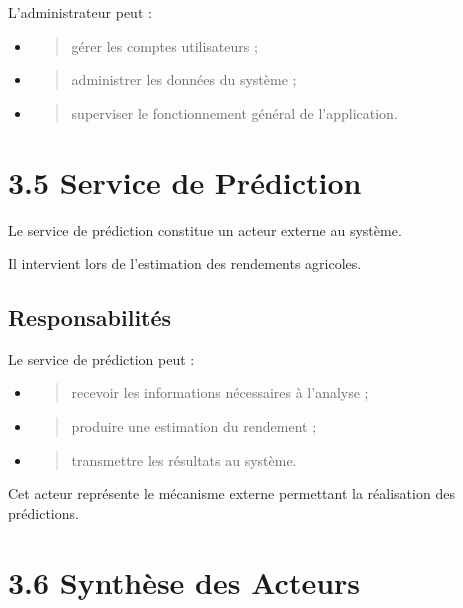 \documentclass[
]{book}
\begin{document}
L'administrateur peut :

\begin{itemize}
\item
  \begin{quote}
  gérer les comptes utilisateurs ;
  \end{quote}
\item
  \begin{quote}
  administrer les données du système ;
  \end{quote}
\item
  \begin{quote}
  superviser le fonctionnement général de l'application.
  \end{quote}
\end{itemize}

\hypertarget{service-de-pruxe9diction}{%
\section{3.5 Service de Prédiction}\label{service-de-pruxe9diction}}

Le service de prédiction constitue un acteur externe au système.

Il intervient lors de l'estimation des rendements agricoles.

\hypertarget{responsabilituxe9s-3}{%
\subsection{Responsabilités}\label{responsabilituxe9s-3}}

Le service de prédiction peut :

\begin{itemize}
\item
  \begin{quote}
  recevoir les informations nécessaires à l'analyse ;
  \end{quote}
\item
  \begin{quote}
  produire une estimation du rendement ;
  \end{quote}
\item
  \begin{quote}
  transmettre les résultats au système.
  \end{quote}
\end{itemize}

Cet acteur représente le mécanisme externe permettant la réalisation des
prédictions.

\hypertarget{synthuxe8se-des-acteurs}{%
\section{3.6 Synthèse des Acteurs}\label{synthuxe8se-des-acteurs}}
\end{document}
